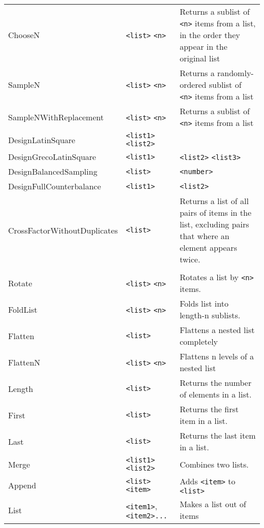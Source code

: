 \begin{longtable}{p{3cm}p{3cm}p{6cm}}
ChooseN     & \verb+<list>+ \verb+<n>+ & Returns a sublist of \verb+<n>+ items from a 
			    list, in the order they appear in the original list\\
SampleN     & \verb+<list>+ \verb+<n>+ & Returns a randomly-ordered sublist of \verb+<n>+ items from a list\\
SampleNWithReplacement      &\hspace{1.5cm} \verb+<list>+ \verb+<n>+& Returns a sublist of \verb+<n>+ items from a list \\
DesignLatinSquare           &\verb+<list1>+ \verb+<list2>+ & \\
DesignGrecoLatinSquare      &\hspace{1.5cm}\verb+<list1>+   &\verb+<list2>+ \verb+<list3>+ \\
DesignBalancedSampling      &\hspace{1.5cm}\verb+<list>+   & \verb+<number>+ \\
DesignFullCounterbalance    &\hspace{1.5cm}\verb+<list1>+   &\verb+<list2>+ \\ 
CrossFactorWithoutDuplicates&\hspace{1.8cm}\verb+<list>+  & Returns a list of all pairs of items in the list, excluding pairs that where an element appears twice. \\
 &    & \\
Rotate     &\verb+<list>+ \verb+<n>+ &        Rotates a list by \verb+<n>+ items.\\ 
FoldList   &\verb+<list>+ \verb+<n>+ &        Folds list into length-n sublists.\\
Flatten    &\verb+<list>+            & Flattens a nested list completely\\
FlattenN   &\verb+<list>+ \verb+<n>+ & Flattens n levels of a nested list\\
Length     &\verb+<list>+            & Returns the number of elements in a list.\\
First      &\verb+<list>+            & Returns the first item in a list. \\
Last       &\verb+<list>+            & Returns the last item in a list.\\
Merge      &\verb+<list1>+ \verb+<list2>+&  Combines two lists.\\
Append     &\verb+<list>+ \verb+<item>+  &  Adds \verb+<item>+ to \verb+<list>+ \\
List       &\verb+<item1>+, \verb+<item2>...+ &Makes a list out of items\\

\end{longtable}
